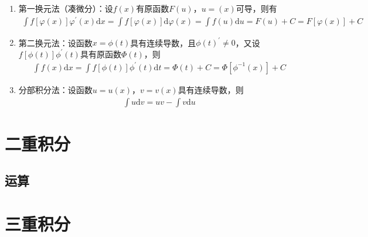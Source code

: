 \documentclass[12pt]{book}
\begin{document}
\begin{enumerate}
    \item 第一换元法（凑微分）：设$f(x)$有原函数$F(u)$，$u=(x)$可导，则有
          \begin{gather*}
              \int{f[\varphi(x)]\varphi^\prime(x)\mathrm{d}x}
              = \int{f[\varphi(x)]\mathrm{d}\varphi(x)}
              = \int{f(u)\mathrm{d}u}
              = F(u)+C = F[\varphi(x)]+C
          \end{gather*}
    \item 第二换元法：设函数$x=\phi(t)$具有连续导数，且$\phi(t)^\prime \neq 0$，又设$f[\phi(t)]\phi^\prime(t)$具有原函数$\varPhi(t) $，则
    \begin{gather*}
        \int{f(x)\mathrm{d}x} = \int{f[\phi(t)]\phi^\prime(t) \mathrm{d}t} = \varPhi(t)+C = \varPhi[\phi^{-1}(x)]+C
    \end{gather*}
    \item 分部积分法：设函数$u=u(x)$，$v=v(x)$具有连续导数，则
          \begin{gather*}
              \int{u\mathrm{d}v} = uv-\int{v\mathrm{d}u}
          \end{gather*}
\end{enumerate}



\section{二重积分}




\subsection{运算}




\section{三重积分}
\end{document}
